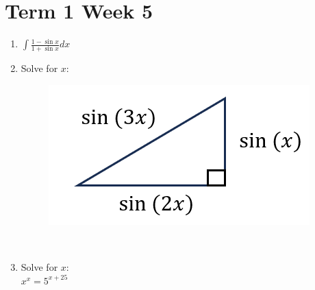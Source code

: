 \documentclass[../main.tex]{subfiles}
\begin{document}
\section*{Term 1 Week 5}
\begin{enumerate}
    \item 
    \(\int \frac{1-\sin{x}}{1+\sin{x}} dx\)\\

    \item 
    Solve for \(x\):\\
    \begin{figure}[h]
        \centering
        \includegraphics{images/t1w5q2.png}
    \end{figure}\\

    \item 
    Solve for \(x\):\\
    
    \setlength{\parindent}{20pt}
    \(x^x=5^{x+25}\)
\end{enumerate}
\end{document}

